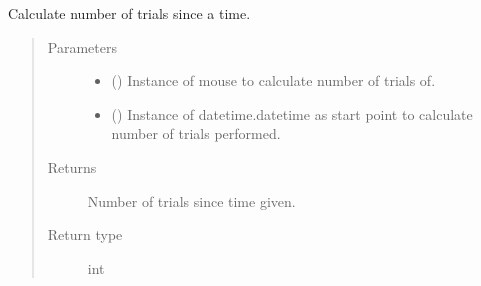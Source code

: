 \documentclass[letterpaper,10pt,english]{sphinxmanual}
\begin{document}
\begin{fulllineitems}
\label{\detokenize{NoSeMazeControl/Analysis:Analysis.Analysis.n_trials_since}}
\pysigstartsignatures
{}
\pysigstopsignatures
\sphinxAtStartPar
Calculate number of trials since a time.
\begin{quote}\begin{description}
\item[{Parameters}] \leavevmode\begin{itemize}
\item {} 
\sphinxAtStartPar
{} () \textendash{} Instance of mouse to calculate number of trials of.

\item {} 
\sphinxAtStartPar
{} () \textendash{} Instance of datetime.datetime as start point to calculate number of
trials performed.

\end{itemize}

\item[{Returns}] \leavevmode
\sphinxAtStartPar
{} \textendash{} Number of trials since time given.

\item[{Return type}] \leavevmode
\sphinxAtStartPar
int

\end{description}\end{quote}

\end{fulllineitems}

\end{document}
